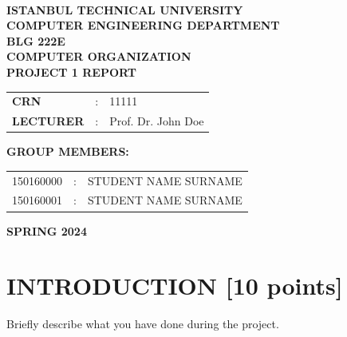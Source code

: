 \documentclass[pdftex,12pt,a4paper]{article}
\begin{document}
\begin{titlepage}
\begin{center}
\textbf{}\\
\textbf{\Large{ISTANBUL TECHNICAL UNIVERSITY}}\\
\vspace{0.5cm}
\textbf{\Large{COMPUTER ENGINEERING DEPARTMENT}}\\
\vspace{4cm}
\textbf{\Large{BLG 222E\\ COMPUTER ORGANIZATION\\ PROJECT 1 REPORT}}\\
\vspace{4cm}
\begin{table}[ht]
\centering
\Large{
\begin{tabular}{lcl}
\textbf{CRN}  & : & 11111 \\
\textbf{LECTURER}  & : & Prof. Dr. John Doe \\
\end{tabular}}
\end{table}
\vspace{1cm}
\textbf{\Large{GROUP MEMBERS:}}\\
\begin{table}[ht]
\centering
\Large{
\begin{tabular}{rcl}
150160000  & : & STUDENT NAME SURNAME \\
150160001  & : & STUDENT NAME SURNAME \\
\end{tabular}}
\end{table}
\vspace{2.8cm}
\textbf{\Large{SPRING 2024}}

\end{center}

\end{titlepage}

\thispagestyle{empty}
\setcounter{tocdepth}{4}
\tableofcontents
\clearpage

\setcounter{page}{1}

\section{INTRODUCTION [10 points]}

Briefly describe what you have done during the project.
\end{document}
